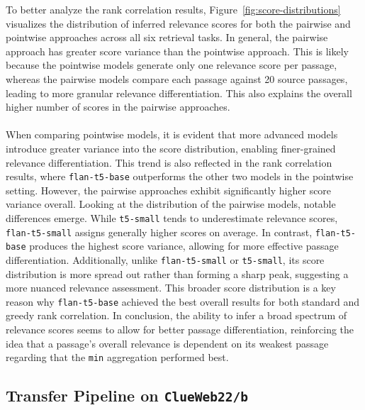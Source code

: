 \\\\\\\\\\
To better analyze the rank correlation results, Figure~\ref{fig:score-distributions} visualizes the distribution of inferred relevance scores for both the pairwise and pointwise approaches across all six retrieval tasks. In general, the pairwise approach has greater score variance than the pointwise approach. This is likely because the pointwise models generate only one relevance score per passage, whereas the pairwise models compare each passage against 20 source passages, leading to more granular relevance differentiation. This also explains the overall higher number of scores in the pairwise approaches.
\\\\
When comparing pointwise models, it is evident that more advanced models introduce greater variance into the score distribution, enabling finer-grained relevance differentiation. This trend is also reflected in the rank correlation results, where \texttt{flan-t5-base} outperforms the other two models in the pointwise setting. However, the pairwise approaches exhibit significantly higher score variance overall. Looking at the distribution of the pairwise models, notable differences emerge. While \texttt{t5-small} tends to underestimate relevance scores, \texttt{flan-t5-small} assigns generally higher scores on average. In contrast, \texttt{flan-t5-base} produces the highest score variance, allowing for more effective passage differentiation. Additionally, unlike \texttt{flan-t5-small} or \texttt{t5-small}, its score distribution is more spread out rather than forming a sharp peak, suggesting a more nuanced relevance assessment. This broader score distribution is a key reason why \texttt{flan-t5-base} achieved the best overall results for both standard and greedy rank correlation. In conclusion, the ability to infer a broad spectrum of relevance scores seems to allow for better passage differentiation, reinforcing the idea that a passage's overall relevance is dependent on its weakest passage regarding that the \texttt{min} aggregation performed best.

\pagebreak
\subsection{Transfer Pipeline on \texttt{ClueWeb22/b}}\label{eval-pairwise-preferences-target}


